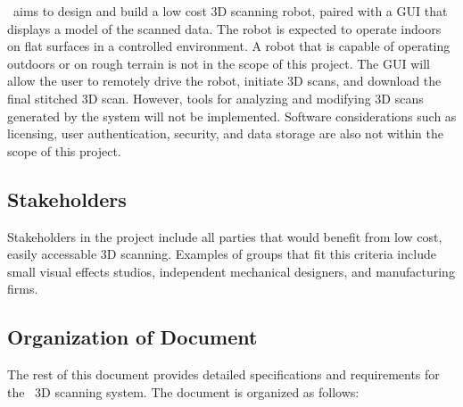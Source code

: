 \documentclass[12pt]{article}
\begin{document}

\progname\ aims to design and build a low cost 3D scanning robot, paired with a GUI that displays a model of the scanned data.
The robot is expected to operate indoors on flat surfaces in a controlled environment.
A robot that is capable of operating outdoors or on rough terrain is not in the scope of this project.
The GUI will allow the user to remotely drive the robot, initiate 3D scans, and download the final stitched 3D scan.
However, tools for analyzing and modifying 3D scans generated by the system will not be implemented.
Software considerations such as licensing, user authentication, security, and data storage are also not within the scope of this project.

\subsection{Stakeholders}

Stakeholders in the project include all parties that would benefit from low cost, easily accessable 3D scanning. Examples of groups that fit this criteria include small visual effects studios, independent mechanical designers, and manufacturing firms. 

\subsection{Organization of Document}

The rest of this document provides detailed specifications and requirements for the \progname\ 3D scanning system. The document is organized as follows:  
  
\end{document}
